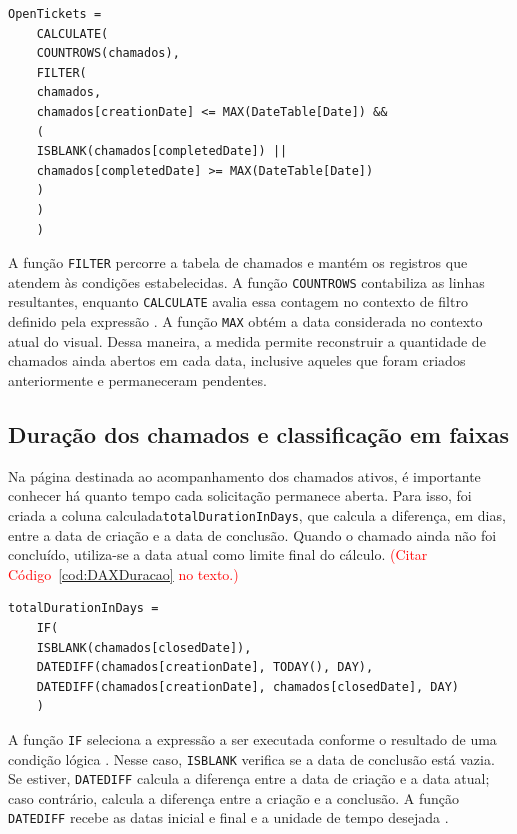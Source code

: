 \begin{lstlisting}[caption={Medida \texttt{OpenTickets}.}, label = {cod:OpenTickets}]
	OpenTickets =
	CALCULATE(
	COUNTROWS(chamados),
	FILTER(
	chamados,
	chamados[creationDate] <= MAX(DateTable[Date]) &&
	(
	ISBLANK(chamados[completedDate]) ||
	chamados[completedDate] >= MAX(DateTable[Date])
	)
	)
	)
\end{lstlisting}



A função \texttt{FILTER} percorre a tabela de chamados e mantém os registros que atendem às condições estabelecidas. A função \texttt{COUNTROWS} contabiliza as linhas resultantes, enquanto \texttt{CALCULATE} avalia essa contagem no contexto de filtro definido pela expressão \cite{DAX_CALCULATE} \cite{DAX_COUNTROWS} \cite{DAX_FILTER}. A função \texttt{MAX} obtém a data considerada no contexto atual do visual. Dessa maneira, a medida permite reconstruir a quantidade de chamados ainda abertos em cada data, inclusive aqueles que foram criados anteriormente e permaneceram pendentes.


\subsection{Duração dos chamados e classificação em faixas}

Na página destinada ao acompanhamento dos chamados ativos, é importante conhecer há quanto tempo cada solicitação permanece aberta. Para isso, foi criada a coluna calculada\linebreak   \texttt{totalDurationInDays}, que calcula a diferença, em dias, entre a data de criação e a data de conclusão. Quando o chamado ainda não foi concluído, utiliza-se a data atual como limite final do cálculo. \textcolor{red}{(Citar Código~\ref{cod:DAXDuracao} no texto.)}\\

\begin{lstlisting}[caption={Cálculo da duração dos chamados em dias feito em DAX.}, label = {cod:DAXDuracao}]
	totalDurationInDays =
	IF(
	ISBLANK(chamados[closedDate]),
	DATEDIFF(chamados[creationDate], TODAY(), DAY),
	DATEDIFF(chamados[creationDate], chamados[closedDate], DAY)
	)
\end{lstlisting}


A função \texttt{IF} seleciona a expressão a ser executada conforme o resultado de uma condição lógica \cite{DAX_IF}. Nesse caso, \texttt{ISBLANK} verifica se a data de conclusão está vazia. Se estiver, \texttt{DATEDIFF} calcula a diferença entre a data de criação e a data atual; caso contrário, calcula a diferença entre a criação e a conclusão. A função \texttt{DATEDIFF} recebe as datas inicial e final e a unidade de tempo desejada \cite{DAX_ISBLANK} \cite{DAX_DATEDIFF}.

